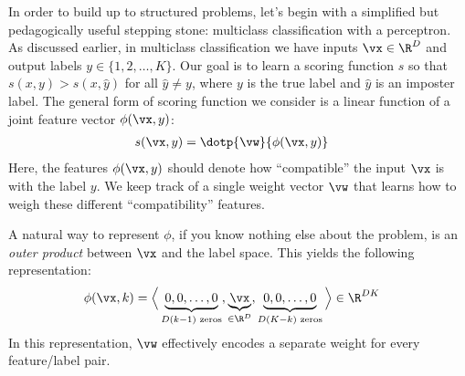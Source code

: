 
In order to build up to structured problems, let's begin with a simplified but pedagogically useful stepping stone: multiclass classification with a perceptron.
As discussed earlier, in multiclass classification we have inputs $\vx \in \R^D$ and output labels $y \in \{ 1, 2, \dots, K \}$.
Our goal is to learn a scoring function $s$ so that $s(x,y) > s(x,\hat y)$ for all $\hat y \neq y$, where $y$ is the true label and $\hat y$ is an imposter label.
The general form of scoring function we consider is a linear function of a joint feature vector $\phi(\vx,y)$:
%
\begin{align}
s(\vx,y) &= \dotp{\vw}{\phi(\vx,y)}
\end{align}
%
Here, the features $\phi(\vx,y)$ should denote how ``compatible'' the input $\vx$ is with the label $y$.
We keep track of a single weight vector $\vw$ that learns how to weigh these different ``compatibility'' features.

A natural way to represent $\phi$, if you know nothing else about the problem, is an \emph{outer product} between $\vx$ and the label space.
This yields the following representation:
\begin{align}
  \phi(\vx,k) &= \Big\langle
                \underbrace{0, 0, \dots, 0}_{D(k-1) \text{ zeros}},
                \underbrace{\vx}_{\in \R^D},
                \underbrace{0, 0, \dots, 0}_{D(K-k) \text{ zeros}}
                \Big\rangle \in \R^{DK} \label{eq:defphi}
\end{align}
%
In this representation, $\vw$ effectively encodes a separate weight for every feature/label pair.

